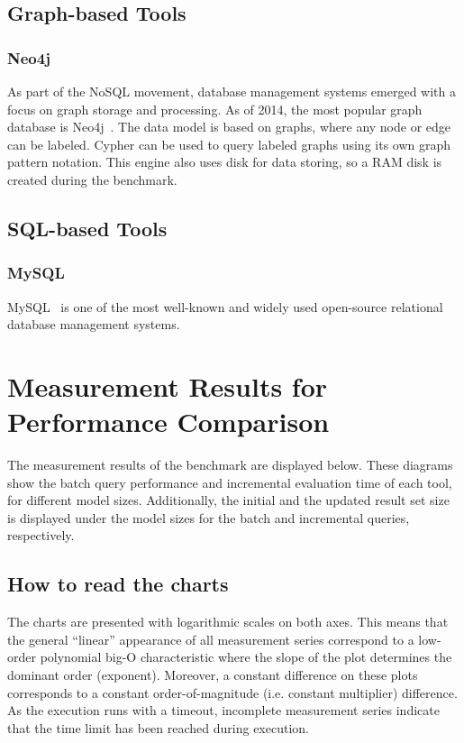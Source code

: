 \subsection{Graph-based Tools}

\subsubsection{Neo4j}
As part of the NoSQL movement, database management systems emerged with a focus on graph storage and processing. As of 2014, the most popular graph database is 
Neo4j~\cite{neo4j}. The data model is based on graphs, where any node or edge can be labeled. Cypher can be used to query labeled graphs using its own graph pattern notation. This engine also uses disk for data storing, so a RAM disk is created during the benchmark.

\subsection{SQL-based Tools}

\subsubsection{MySQL}
MySQL~\cite{mysql} is one of the most well-known and widely used open-source relational database management systems.


\section{Measurement Results for Performance Comparison}
\label{sec:results}

The measurement results of the benchmark are displayed below. These diagrams show the batch query performance and incremental evaluation time of each tool, for different model sizes. Additionally, the initial and the updated result set size is displayed under the model sizes for the batch and incremental queries, respectively.

\subsection{How to read the charts}

The charts are presented with logarithmic scales on both axes. This means that the general ``linear'' appearance of all measurement series correspond to a low-order polynomial big-O characteristic where the slope of the plot determines the dominant order (exponent). Moreover, a constant difference on these plots corresponds to a constant order-of-magnitude (i.e. constant multiplier) difference. As the execution runs with a timeout, incomplete measurement series indicate that the time limit has been reached during execution.
 
